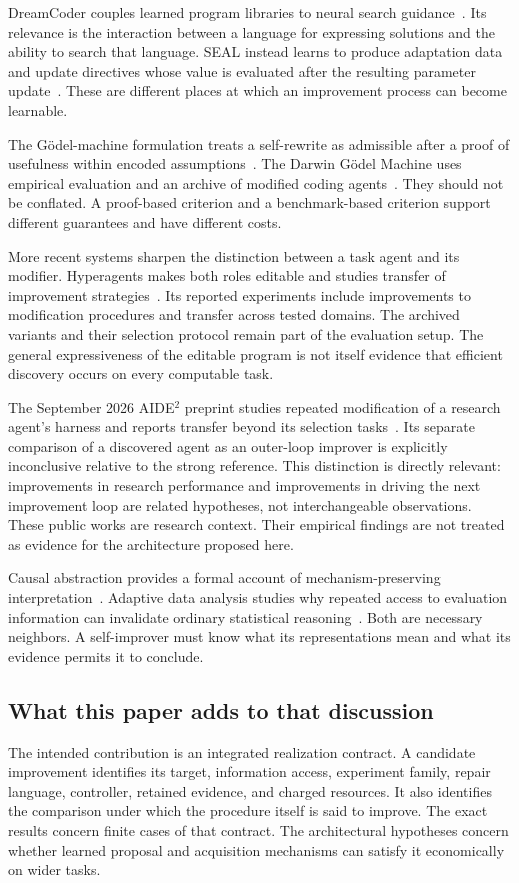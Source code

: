 \documentclass[11pt,letterpaper]{article}
\theoremstyle{plain}
\theoremstyle{definition}
\begin{document}
DreamCoder couples learned program libraries to neural search guidance~\cite{dreamcoder}. Its relevance is the interaction between a language for expressing solutions and the ability to search that language. SEAL instead learns to produce adaptation data and update directives whose value is evaluated after the resulting parameter update~\cite{seal}. These are different places at which an improvement process can become learnable.

The G\"odel-machine formulation treats a self-rewrite as admissible after a proof of usefulness within encoded assumptions~\cite{goedel}. The Darwin G\"odel Machine uses empirical evaluation and an archive of modified coding agents~\cite{dgm}. They should not be conflated. A proof-based criterion and a benchmark-based criterion support different guarantees and have different costs.

More recent systems sharpen the distinction between a task agent and its modifier. Hyperagents makes both roles editable and studies transfer of improvement strategies~\cite{hyperagents}. Its reported experiments include improvements to modification procedures and transfer across tested domains. The archived variants and their selection protocol remain part of the evaluation setup. The general expressiveness of the editable program is not itself evidence that efficient discovery occurs on every computable task.

The September 2026 AIDE$^2$ preprint studies repeated modification of a research agent's harness and reports transfer beyond its selection tasks~\cite{aide}. Its separate comparison of a discovered agent as an outer-loop improver is explicitly inconclusive relative to the strong reference. This distinction is directly relevant: improvements in research performance and improvements in driving the next improvement loop are related hypotheses, not interchangeable observations. These public works are research context. Their empirical findings are not treated as evidence for the architecture proposed here.

Causal abstraction provides a formal account of mechanism-preserving interpretation~\cite{geiger}. Adaptive data analysis studies why repeated access to evaluation information can invalidate ordinary statistical reasoning~\cite{dwork}. Both are necessary neighbors. A self-improver must know what its representations mean and what its evidence permits it to conclude.


\subsection{What this paper adds to that discussion}
The intended contribution is an integrated realization contract. A candidate improvement identifies its target, information access, experiment family, repair language, controller, retained evidence, and charged resources. It also identifies the comparison under which the procedure itself is said to improve. The exact results concern finite cases of that contract. The architectural hypotheses concern whether learned proposal and acquisition mechanisms can satisfy it economically on wider tasks.
\end{document}
